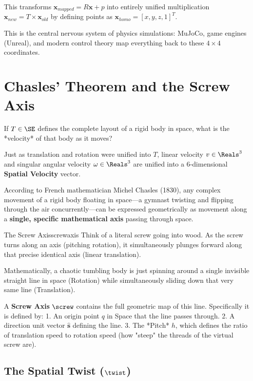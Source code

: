 This transforms $\bm{x}_{mapped} = R\bm{x} + p$ into entirely unified multiplication $\bm{x}_{new} = T \times \bm{x}_{old}$ by defining points as $\bm{x}_{homo} = [x, y, z, 1]^T$. 

This is the central nervous system of physics simulations: MuJoCo, game engines (Unreal), and modern control theory map everything back to these $4 \times 4$ coordinates. 

\section{Chasles' Theorem and the Screw Axis}

If $T \in \SE$ defines the complete layout of a rigid body in space, what is the *velocity* of that body as it moves? 

Just as translation and rotation were unified into $T$, linear velocity $v \in \Reals^3$ and singular angular velocity $\omega \in \Reals^3$ are unified into a 6-dimensional \textbf{Spatial Velocity} vector.

According to French mathematician Michel Chasles (1830), any complex movement of a rigid body floating in space—a gymnast twisting and flipping through the air concurrently—can be expressed geometrically as movement along a \textbf{single, specific mathematical axis} passing through space.

\begin{laymansbox}{The Screw Axis}{screwaxis}
  Think of a literal screw going into wood. As the screw turns along an axis (pitching rotation), it simultaneously plunges forward along that precise identical axis (linear translation). 
  
  Mathematically, a chaotic tumbling body is just spinning around a single invisible straight line in space (Rotation) while simultaneously sliding down that very same line (Translation).
\end{laymansbox}

A \textbf{Screw Axis} $\screw$ contains the full geometric map of this line. Specifically it is defined by:
1. An origin point $q$ in Space that the line passes through.
2. A direction unit vector $\hat{\bm{s}}$ defining the line.
3. The *Pitch* $h$, which defines the ratio of translation speed to rotation speed (how "steep" the threads of the virtual screw are).

\subsection{The Spatial Twist ($\twist$)}

